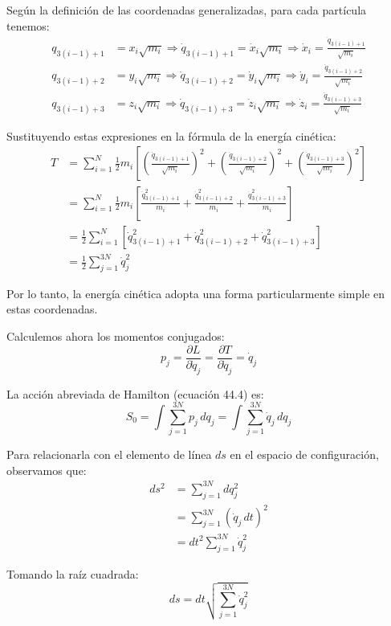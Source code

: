 \documentclass[12pt]{article}
\begin{document}
\begin{enumerate}
  Según la definición de las coordenadas generalizadas, para cada partícula tenemos:
  \begin{align}
  q_{3(i-1)+1} &= x_i\sqrt{m_i} \Rightarrow \dot{q}_{3(i-1)+1} = \dot{x}_i\sqrt{m_i} \Rightarrow \dot{x}_i = \frac{\dot{q}_{3(i-1)+1}}{\sqrt{m_i}} \\
  q_{3(i-1)+2} &= y_i\sqrt{m_i} \Rightarrow \dot{q}_{3(i-1)+2} = \dot{y}_i\sqrt{m_i} \Rightarrow \dot{y}_i = \frac{\dot{q}_{3(i-1)+2}}{\sqrt{m_i}} \\
  q_{3(i-1)+3} &= z_i\sqrt{m_i} \Rightarrow \dot{q}_{3(i-1)+3} = \dot{z}_i\sqrt{m_i} \Rightarrow \dot{z}_i = \frac{\dot{q}_{3(i-1)+3}}{\sqrt{m_i}}
  \end{align}

  Sustituyendo estas expresiones en la fórmula de la energía cinética:
  \begin{align}
  T &= \sum_{i=1}^N \frac{1}{2}m_i\left[\left(\frac{\dot{q}_{3(i-1)+1}}{\sqrt{m_i}}\right)^2 + \left(\frac{\dot{q}_{3(i-1)+2}}{\sqrt{m_i}}\right)^2 + \left(\frac{\dot{q}_{3(i-1)+3}}{\sqrt{m_i}}\right)^2\right] \\
  &= \sum_{i=1}^N \frac{1}{2}m_i\left[\frac{\dot{q}_{3(i-1)+1}^2}{m_i} + \frac{\dot{q}_{3(i-1)+2}^2}{m_i} + \frac{\dot{q}_{3(i-1)+3}^2}{m_i}\right] \\
  &= \frac{1}{2}\sum_{i=1}^N \left[\dot{q}_{3(i-1)+1}^2 + \dot{q}_{3(i-1)+2}^2 + \dot{q}_{3(i-1)+3}^2\right] \\
  &= \frac{1}{2}\sum_{j=1}^{3N} \dot{q}_j^2
  \end{align}

  Por lo tanto, la energía cinética adopta una forma particularmente simple en estas coordenadas.

  Calculemos ahora los momentos conjugados:
  \[
  p_j = \frac{\partial L}{\partial \dot{q}_j} = \frac{\partial T}{\partial \dot{q}_j} = \dot{q}_j
  \]

  La acción abreviada de Hamilton (ecuación 44.4) es:
  \[
  S_0 = \int\sum_{j=1}^{3N}p_j\,dq_j = \int\sum_{j=1}^{3N}\dot{q}_j\,dq_j
  \]

  Para relacionarla con el elemento de línea $ds$ en el espacio de configuración, observamos que:
  \begin{align}
  ds^2 &= \sum_{j=1}^{3N}dq_j^2 \\
  &= \sum_{j=1}^{3N}(\dot{q}_j\,dt)^2 \\
  &= dt^2\sum_{j=1}^{3N}\dot{q}_j^2
  \end{align}

  Tomando la raíz cuadrada:
  \[
  ds = dt\sqrt{\sum_{j=1}^{3N}\dot{q}_j^2}
  \]


\end{enumerate}
\end{document}

